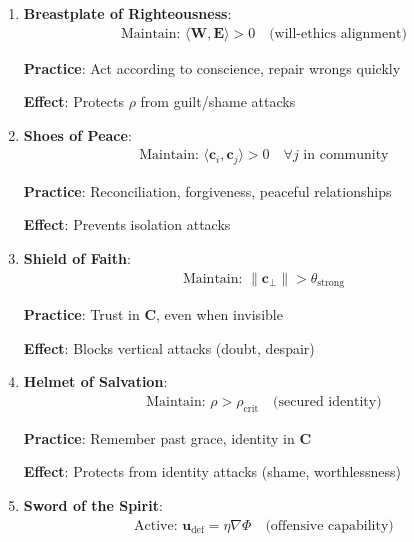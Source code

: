 \documentclass[11pt,a4paper]{article}
\theoremstyle{definition}
\theoremstyle{remark}
\newcommand{\EE}{\mathbf{E}}
\newcommand{\WW}{\mathbf{W}}
\newcommand{\cc}{\mathbf{c}}
\begin{document}
\begin{small}
\begin{enumerate}
\begin{protocol}
\begin{enumerate}
        \textbf{Practice}: Daily reality-checking, reject lies/self-deception
        
        \textbf{Effect}: Prevents distortion attacks on \(\cc\)
    
    \item \textbf{Breastplate of Righteousness}:
        \begin{align}
        \text{Maintain: } \langle \WW, \EE \rangle > 0 \quad \text{(will-ethics alignment)}
        \end{align}
        
        \textbf{Practice}: Act according to conscience, repair wrongs quickly
        
        \textbf{Effect}: Protects \(\rho\) from guilt/shame attacks
    
    \item \textbf{Shoes of Peace}:
        \begin{align}
        \text{Maintain: } \langle \cc_i, \cc_j \rangle > 0 \quad \forall j \text{ in community}
        \end{align}
        
        \textbf{Practice}: Reconciliation, forgiveness, peaceful relationships
        
        \textbf{Effect}: Prevents isolation attacks
    
    \item \textbf{Shield of Faith}:
        \begin{align}
        \text{Maintain: } \|\cc_\perp\| > \theta_{\text{strong}}
        \end{align}
        
        \textbf{Practice}: Trust in \(\mathbf{C}\), even when invisible
        
        \textbf{Effect}: Blocks vertical attacks (doubt, despair)
    
    \item \textbf{Helmet of Salvation}:
        \begin{align}
        \text{Maintain: } \rho > \rho_{\text{crit}} \quad \text{(secured identity)}
        \end{align}
        
        \textbf{Practice}: Remember past grace, identity in \(\mathbf{C}\)
        
        \textbf{Effect}: Protects from identity attacks (shame, worthlessness)
    
    \item \textbf{Sword of the Spirit}:
        \begin{align}
        \text{Active: } \mathbf{u}_{\text{def}} = \eta \nabla \Phi \quad \text{(offensive capability)}
        \end{align}
        

\end{enumerate}
\end{protocol}
\end{enumerate}
\end{small}
\end{document}
